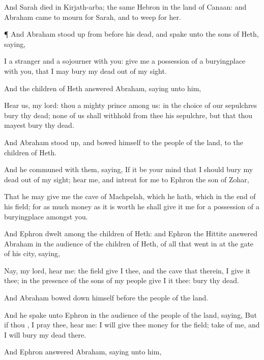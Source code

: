 {And
Sarah
died in
Kirjath-arba; the same
{}
Hebron in the
land of
Canaan: and
Abraham
came to
mourn for
Sarah, and to
weep for her.


\par }{\PP {}¶ And
Abraham stood
up from
before his
dead, and
spake unto the
sons of
Heth,
saying,

I
{} a
stranger and a
sojourner with you:
give me a
possession of a
buryingplace with you, that I may
bury my
dead out of my
sight.

And the
children of
Heth
answered
Abraham,
saying unto him,

Hear
us, my
lord: thou
{} a
mighty
prince among
us: in the
choice of our
sepulchres
bury thy
dead;
none of us shall
withhold from thee his
sepulchre, but that thou mayest
bury thy
dead.

And
Abraham stood
up, and
bowed himself to the
people of the
land,
{} to the
children of
Heth.

And he
communed with them,
saying, If it
be your
mind that I should
bury my
dead out of my
sight;
hear me, and
intreat for me to
Ephron the
son of
Zohar,

That he may
give me the
cave of
Machpelah, which he hath, which
{} in the
end of his
field; for as
much
money as it is
worth he shall give
it me for a
possession of a
buryingplace amongst
you.

And
Ephron
dwelt
among the
children of
Heth: and
Ephron the
Hittite
answered
Abraham in the
audience of the
children of
Heth,
{} of all that went
in at the
gate of his
city,
saying,

Nay, my
lord, hear
me: the
field give
I thee, and the
cave that
{} therein, I give
it thee; in the
presence of the
sons of my
people
give I it thee:
bury thy
dead.

And
Abraham bowed
down himself
before the
people of the
land.

And he
spake unto
Ephron in the
audience of the
people of the
land,
saying, But if thou
{}, I pray
thee,
hear me: I will
give thee
money for the
field;
take
{} of me, and I will
bury my
dead there.

And
Ephron
answered
Abraham,
saying unto him,

}
